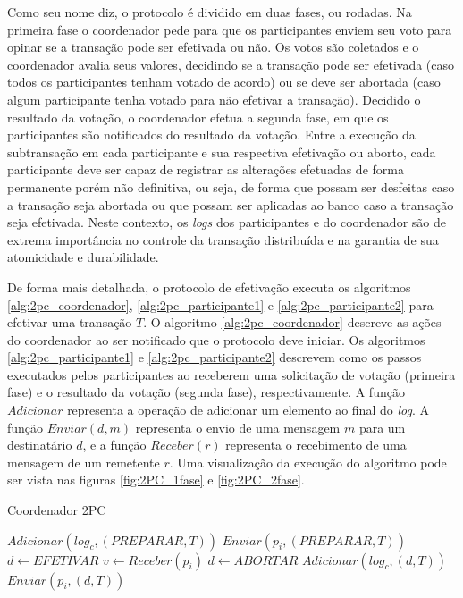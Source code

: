 \documentclass[11pt,twoside,a4paper]{book}
\begin{document}
Como seu nome diz, o protocolo é dividido em duas fases, ou rodadas. Na primeira fase o coordenador pede para que os participantes enviem seu voto para opinar se a transação pode ser efetivada ou não. Os votos são coletados e o coordenador avalia seus valores, decidindo se a transação pode ser efetivada (caso todos os participantes tenham votado de acordo) ou se deve ser abortada (caso algum participante tenha votado para não efetivar a transação). Decidido o resultado da votação, o coordenador efetua a segunda fase, em que os participantes são notificados do resultado da votação. Entre a execução da subtransação em cada participante e sua respectiva efetivação ou aborto, cada participante deve ser capaz de registrar as alterações efetuadas de forma permanente porém não definitiva, ou seja, de forma que possam ser desfeitas caso a transação seja abortada ou que possam ser aplicadas ao banco caso a transação seja efetivada. Neste contexto, os \emph{logs} dos participantes e do coordenador são de extrema importância no controle da transação distribuída e na garantia de sua atomicidade e durabilidade.

De forma mais detalhada, o protocolo de efetivação executa os algoritmos \ref{alg:2pc_coordenador}, \ref{alg:2pc_participante1} e \ref{alg:2pc_participante2} para efetivar uma transação $T$. O algoritmo \ref{alg:2pc_coordenador} descreve as ações do coordenador ao ser notificado que o protocolo deve iniciar. Os algoritmos \ref{alg:2pc_participante1} e \ref{alg:2pc_participante2} descrevem como os passos executados pelos participantes ao receberem uma solicitação de votação (primeira fase) e o resultado da votação (segunda fase), respectivamente. A função $Adicionar$ representa a operação de adicionar um elemento ao final do \emph{log}. A função $Enviar(d, m)$ representa o envio de uma mensagem $m$ para um destinatário $d$, e a função $Receber(r)$ representa o recebimento de uma mensagem de um remetente $r$. Uma visualização da execução do algoritmo pode ser vista nas figuras \ref{fig:2PC_1fase} e \ref{fig:2PC_2fase}.

\begin{algorithm}
\caption{Coordenador 2PC}
\label{alg:2pc_coordenador}
\begin{algorithmic}[1]
\State $Adicionar(log_c, (PREPARAR, T))$
	\State $Enviar(p_i, (PREPARAR, T))$
\EndFor
\State $d \gets EFETIVAR$
	\State $v \gets Receber(p_i)$
		\State $d \gets ABORTAR$
	\EndIf
\EndFor
\State $Adicionar(log_c, (d, T))$
	\State $Enviar(p_i, (d, T))$
\EndFor
\end{algorithmic}
\end{algorithm}
\end{document}
